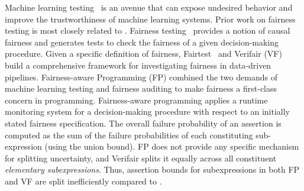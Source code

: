 Machine learning testing~\citep{mltesting} is an avenue that can expose undesired behavior and improve the trustworthiness of machine learning systems.
Prior work on fairness testing is most closely related to \AVOIRmethodname{}.
Fairness testing~\citep{galhotra2017fairness} provides a notion of causal fairness and generates tests to check the fairness of a given decision-making procedure.
Given a specific definition of fairness, Fairtest~\citep{fairtest} and Verifair (VF)~\citep{bastani2019probabilistic} build a comprehensive framework for investigating fairness in data-driven pipelines. 
Fairness-aware Programming (FP) \citep{albarghouthi2019fairness} combined the two demands of machine learning testing and fairness auditing to make fairness a first-class concern in programming. 
Fairness-aware programming applies a runtime monitoring system for a decision-making procedure with respect to an initially stated fairness specification.
The overall failure probability of an assertion is computed as the sum of the failure probabilities of each constituting sub-expression (using the union bound).
FP does not provide any specific mechanism for splitting uncertainty, and Verifair splits it equally across all constituent \textit{elementary subexpressions}.
Thus, assertion bounds for subexpressions in both FP and VF are split inefficiently compared to \AVOIRmethodname{}. 
